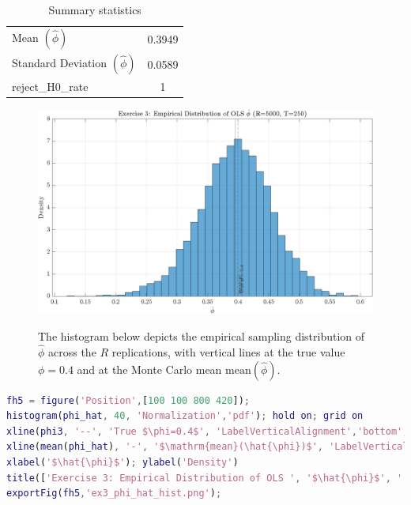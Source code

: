 \documentclass[dvipsnames,11pt]{article}
\begin{document}
\begin{solution}
        \begin{table}[h]
            \centering
            \begin{tabular}{l c}
                \hline
                Mean $(\hat{\phi})$ & 0.3949 \\
                Standard Deviation $(\hat{\phi})$ & 0.0589 \\
                reject\_H0\_rate & 1 \\
                \hline
            \end{tabular}
            \caption{Summary statistics}
            \label{tab:phi_hat_summary}
        \end{table}

        \begin{figure}[h]
            \centering
            \caption{The histogram below depicts the empirical sampling distribution of $\widehat\phi$ across the $R$ replications, with vertical lines at the true value $\phi=0.4$ and at the Monte Carlo mean $\mathrm{mean}(\widehat\phi)$.}
            \includegraphics[width=0.99\linewidth]{output/ex3_phi_hat_hist.png}
            \label{fig:ex3_phi_hat_hist}
        \end{figure}

\begin{lstlisting}[language=Matlab]
% Histogram of phi_hat with reference lines
fh5 = figure('Position',[100 100 800 420]);
histogram(phi_hat, 40, 'Normalization','pdf'); hold on; grid on
xline(phi3, '--', 'True $\phi=0.4$', 'LabelVerticalAlignment','bottom', 'Interpreter','latex');
xline(mean(phi_hat), '-', '$\mathrm{mean}(\hat{\phi})$', 'LabelVerticalAlignment','bottom', 'Interpreter','latex');
xlabel('$\hat{\phi}$'); ylabel('Density')
title(['Exercise 3: Empirical Distribution of OLS ', '$\hat{\phi}$', ' (R=', num2str(R), ', T=', num2str(T), ')'], 'Interpreter','latex')
exportFig(fh5,'ex3_phi_hat_hist.png');
\end{lstlisting}
        
    \end{solution}
\end{document}
